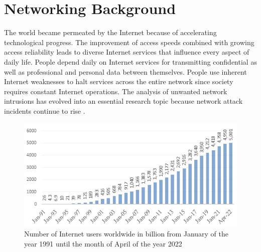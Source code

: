 \section{Networking Background}
The world became permeated by the Internet because of accelerating technological progress. The improvement of access speeds combined with growing access reliability leads to diverse Internet services that influence every aspect of daily life. People depend daily on Internet services for transmitting confidential as well as professional and personal data between themselves. People use inherent Internet weaknesses to halt services across the entire network since society requires constant Internet operations. The analysis of unwanted network intrusions has evolved into an essential research topic because network attack incidents continue to rise \cite{unknown}. 
\\
\begin{figure}[!htb]
    \centering
    \includegraphics[width=0.8\linewidth]{thesis/internetUser.png}
    \caption{Number of Internet users worldwide in billion from January of the year 1991 until the month of April of the year 2022 \cite{bhattacharyya2016ddos}}
    \label{fig:enter-label}
\end{figure}
